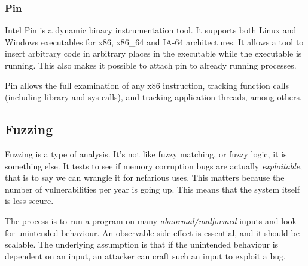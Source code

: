 \documentclass[11pt,a4paper,titlepage,dvipsnames,cmyk]{scrartcl}
\begin{document}
\subsubsection{Pin}
Intel Pin is a dynamic binary instrumentation tool. It supports both Linux and Windows executables for x86, x86\_64 and IA-64 architectures. It allows a tool to insert arbitrary code in arbitrary places in the executable while the executable is running. This also makes it possible to attach pin to already running processes.

Pin allows the full examination of any x86 instruction, tracking function calls (including library and sys calls), and tracking application threads, among others.

\subsection{Fuzzing}
Fuzzing is a type of analysis. It's not like fuzzy matching, or fuzzy logic, it is something else. It tests to see if memory corruption bugs are actually \textit{exploitable}, that is to say we can wrangle it for nefarious uses. This matters because the number of vulnerabilities per year is going up. This means that the system itself is less secure.

The process is to run a program on many \textit{abnormal/malformed} inputs and look for unintended behaviour. An observable side effect is essential, and it should be scalable. The underlying assumption is that if the unintended behaviour is dependent on an input, an attacker can craft such an input to exploit a bug.
\end{document}
